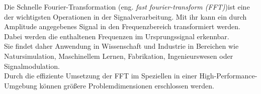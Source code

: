 
Die Schnelle Fourier-Transformation (eng. \textit{fast fourier-transform (FFT)})ist eine der wichtigsten Operationen in der Signalverarbeitung. Mit ihr kann ein durch Amplitude angegebenes Signal in den Frequenzbereich transformiert werden. Dabei werden die enthaltenen Frequenzen im Ursprungssignal erkennbar.\\
Sie findet daher Anwendung in Wissenschaft und Industrie in Bereichen wie Natursimulation, Maschinellem Lernen, Fabrikation, Ingenieurswesen oder Signalmodulation.\\
Durch die effiziente Umsetzung der FFT im Speziellen in einer High-Performance-Umgebung können größere Problemdimensionen erschlossen werden.\\

